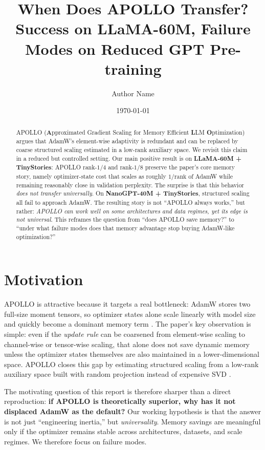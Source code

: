 \documentclass[10pt]{article}
\title{When Does APOLLO Transfer?\\
Success on LLaMA-60M, Failure Modes on Reduced GPT Pre-training}
\author{Author Name}
\date{\today}
\begin{document}
\maketitle

\begin{abstract}
APOLLO (\textbf{A}pproximated Gradient Scaling for Memory Efficient \textbf{L}LM \textbf{O}ptimization) argues that AdamW's element-wise adaptivity is redundant and can be replaced by coarse structured scaling estimated in a low-rank auxiliary space. We revisit this claim in a reduced but controlled setting. Our main positive result is on \textbf{LLaMA-60M + TinyStories}: APOLLO rank-$1/4$ and rank-$1/8$ preserve the paper's core memory story, namely optimizer-state cost that scales as roughly $1/\text{rank}$ of AdamW while remaining reasonably close in validation perplexity. The surprise is that this behavior \emph{does not transfer universally}. On \textbf{NanoGPT-40M + TinyStories}, structured scaling all fail to approach AdamW. The resulting story is not ``APOLLO always works,'' but rather: \emph{APOLLO can work well on some architectures and data regimes, yet its edge is not universal}. This reframes the question from ``does APOLLO save memory?'' to ``under what failure modes does that memory advantage stop buying AdamW-like optimization?'' 
\end{abstract}

\section{Motivation}
APOLLO is attractive because it targets a real bottleneck: AdamW stores two full-size moment tensors, so optimizer states alone scale linearly with model size and quickly become a dominant memory term \cite{kingma2014adam, apollo2025}. The paper's key observation is simple: even if the \emph{update rule} can be coarsened from element-wise scaling to channel-wise or tensor-wise scaling, that alone does not save dynamic memory unless the optimizer states themselves are also maintained in a lower-dimensional space. APOLLO closes this gap by estimating structured scaling from a low-rank auxiliary space built with random projection instead of expensive SVD \cite{apollo2025}.

The motivating question of this report is therefore sharper than a direct reproduction: \textbf{if APOLLO is theoretically superior, why has it not displaced AdamW as the default?} Our working hypothesis is that the answer is not just ``engineering inertia,'' but \emph{universality}. Memory savings are meaningful only if the optimizer remains stable across architectures, datasets, and scale regimes. We therefore focus on failure modes.
\end{document}
